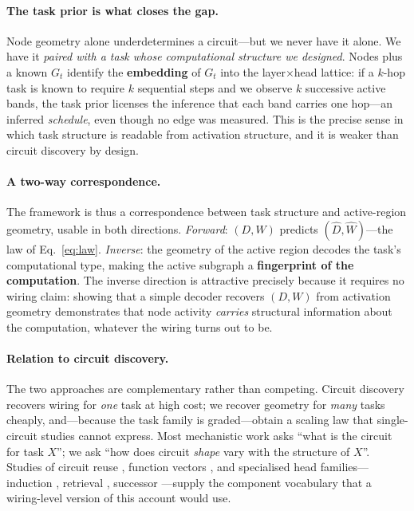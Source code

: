 \documentclass[11pt]{article}
\newcommand{\Dh}{\hat{D}}
\newcommand{\Wh}{\hat{W}}
\begin{document}
\paragraph{The task prior is what closes the gap.}
Node geometry alone underdetermines a circuit---but we never have it alone. We
have it \emph{paired with a task whose computational structure we designed}.
Nodes plus a known $G_t$ identify the \textbf{embedding} of $G_t$ into the
layer$\times$head lattice: if a $k$-hop task is known to require $k$ sequential
steps and we observe $k$ successive active bands, the task prior licenses the
inference that each band carries one hop---an inferred \emph{schedule}, even
though no edge was measured. This is the precise sense in which task structure
is readable from activation structure, and it is weaker than circuit discovery
by design.

\paragraph{A two-way correspondence.}
The framework is thus a correspondence between task structure and active-region
geometry, usable in both directions. \emph{Forward}: $(D,W)$ predicts
$(\Dh,\Wh)$---the law of Eq.~\eqref{eq:law}. \emph{Inverse}: the geometry of
the active region decodes the task's computational type, making the active
subgraph a \textbf{fingerprint of the computation}. The inverse direction is
attractive precisely because it requires no wiring claim: showing that a simple
decoder recovers $(D,W)$ from activation geometry demonstrates that node
activity \emph{carries} structural information about the computation, whatever
the wiring turns out to be.

\paragraph{Relation to circuit discovery.}
The two approaches are complementary rather than competing. Circuit discovery
recovers wiring for \emph{one} task at high cost; we recover geometry for
\emph{many} tasks cheaply, and---because the task family is graded---obtain a
scaling law that single-circuit studies cannot express. Most mechanistic work
asks ``what is the circuit for task $X$''; we ask ``how does circuit
\emph{shape} vary with the structure of $X$''. Studies of circuit reuse
\citep{merullo2024circuit}, function vectors \citep{todd2024function}, and
specialised head families---induction \citep{olsson2022induction}, retrieval
\citep{wu2024retrieval}, successor \citep{gould2023successor}---supply the
component vocabulary that a wiring-level version of this account would use.
\end{document}
